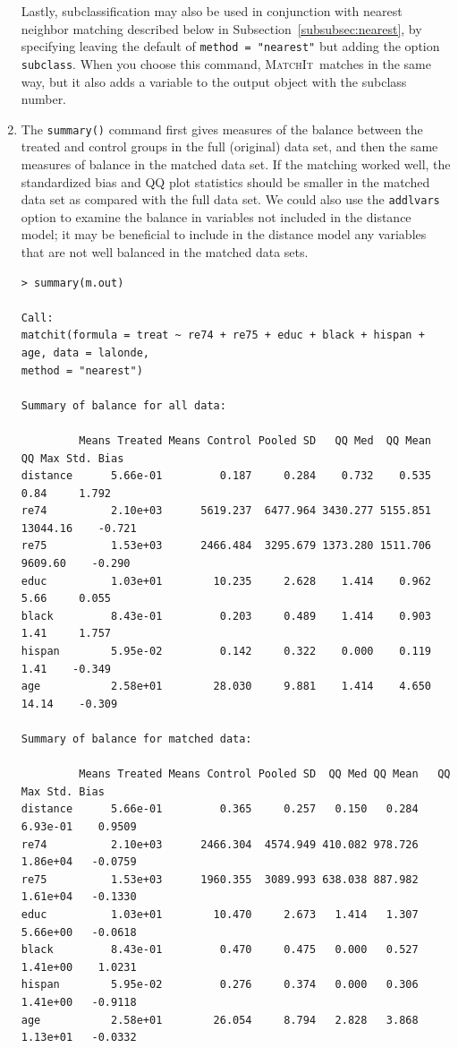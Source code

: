 \documentclass[oneside,letterpaper,titlepage]{article}
\newcommand{\MatchIt}{\textsc{MatchIt}}
\begin{document}
\begin{enumerate}

Lastly, subclassification may also be used in conjunction with nearest
neighbor matching described below in
Subsection~\ref{subsubsec:nearest}, by specifying leaving the default
of \texttt{method = "nearest"} but adding the option
\texttt{subclass}.  When you choose this command, \MatchIt\ matches in
the same way, but it also adds a variable to the output object with
the subclass number.




\item The \texttt{summary()} command first gives measures of the
  balance between the treated and control groups in the full
  (original) data set, and then the same measures of balance in the
  matched data set.  If the matching worked well, the standardized
  bias and QQ plot statistics should be smaller in the matched data
  set as compared with the full data set.  We could also use the
  \texttt{addlvars} option to examine the balance in variables not
  included in the distance model; it may be beneficial to include in
  the distance model any variables that are not well balanced in the
  matched data sets.
\begin{verbatim}
> summary(m.out)

Call:
matchit(formula = treat ~ re74 + re75 + educ + black + hispan + age, data = lalonde, 
method = "nearest")

Summary of balance for all data:

         Means Treated Means Control Pooled SD   QQ Med  QQ Mean   QQ Max Std. Bias
distance      5.66e-01         0.187     0.284    0.732    0.535     0.84     1.792 
re74          2.10e+03      5619.237  6477.964 3430.277 5155.851 13044.16    -0.721
re75          1.53e+03      2466.484  3295.679 1373.280 1511.706  9609.60    -0.290
educ          1.03e+01        10.235     2.628    1.414    0.962     5.66     0.055
black         8.43e-01         0.203     0.489    1.414    0.903     1.41     1.757
hispan        5.95e-02         0.142     0.322    0.000    0.119     1.41    -0.349
age           2.58e+01        28.030     9.881    1.414    4.650    14.14    -0.309
        
Summary of balance for matched data:

         Means Treated Means Control Pooled SD  QQ Med QQ Mean   QQ Max Std. Bias
distance      5.66e-01         0.365     0.257   0.150   0.284 6.93e-01    0.9509
re74          2.10e+03      2466.304  4574.949 410.082 978.726 1.86e+04   -0.0759
re75          1.53e+03      1960.355  3089.993 638.038 887.982 1.61e+04   -0.1330
educ          1.03e+01        10.470     2.673   1.414   1.307 5.66e+00   -0.0618
black         8.43e-01         0.470     0.475   0.000   0.527 1.41e+00    1.0231
hispan        5.95e-02         0.276     0.374   0.000   0.306 1.41e+00   -0.9118
age           2.58e+01        26.054     8.794   2.828   3.868 1.13e+01   -0.0332
        

\end{verbatim}
\end{enumerate}
\end{document}
